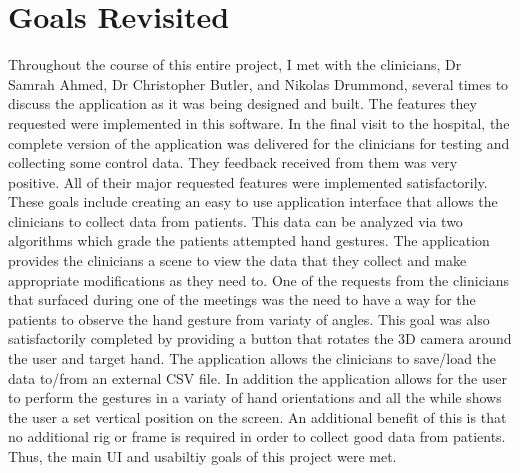 \section{Goals Revisited}
Throughout the course of this entire project, I met with the clinicians, Dr Samrah Ahmed, Dr Christopher Butler, and Nikolas Drummond, several times to discuss the application as it was being designed and built. The features they requested were implemented in this software. In the final visit to the hospital, the complete version of the application was delivered for the clinicians for testing and collecting some control data. They feedback received from them was very positive. All of their major requested features were implemented satisfactorily. These goals include creating an easy to use application interface that allows the clinicians to collect data from patients. This data can be analyzed via two algorithms which grade the patients attempted hand gestures. The application provides the clinicians a scene to view the data that they collect and make appropriate modifications as they need to. One of the requests from the clinicians that surfaced during one of the meetings was the need to have a way for the patients to observe the hand gesture from variaty of angles. This goal was also satisfactorily completed by providing a button that rotates the 3D camera around the user and target hand. The application allows the clinicians to save/load the data to/from an external CSV file. In addition the application allows for the user to perform the gestures in a variaty of hand orientations and all the while shows the user a set vertical position on the screen. An additional benefit of this is that no additional rig or frame is required in order to collect good data from patients. Thus, the main UI and usabiltiy goals of this project were met.















